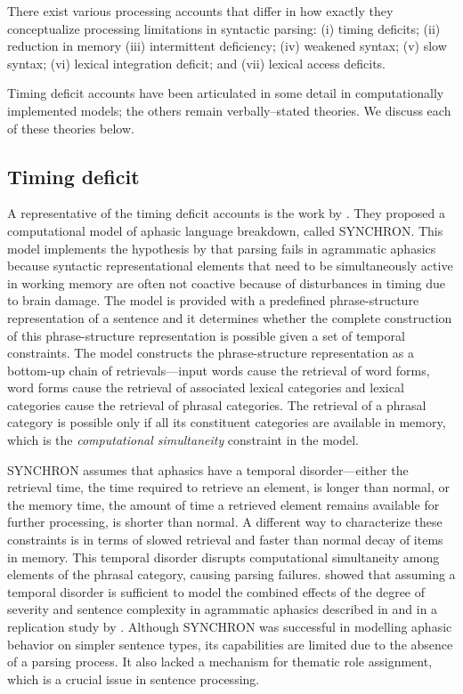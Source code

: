 \documentclass{cambridge7A}\usepackage[]{graphicx}\usepackage[]{color}
\begin{document}
There exist various processing accounts that differ in how exactly they conceptualize processing limitations in syntactic parsing:
(i) timing deficits;
(ii) reduction in memory
(iii) intermittent deficiency;
(iv) weakened syntax;
(v) slow syntax;
(vi) lexical integration deficit;
and (vii) lexical access deficits.

Timing deficit accounts have been articulated in some detail in computationally implemented models; the others remain verbally--stated theories. We discuss each of these theories below.

\subsection{Timing deficit}
A representative of the timing deficit accounts is the work by 
\cite{Haarmann-Kolk-1991}. They proposed a computational model of aphasic language breakdown, called SYNCHRON. This model implements the hypothesis by \cite{Kolk-vanGrunsven-1985} that parsing fails in agrammatic aphasics because syntactic representational elements that need to be simultaneously active in working memory are often not coactive because of disturbances in timing due to brain damage. The model is provided with a predefined phrase-structure representation of a sentence and it determines whether the complete construction of this phrase-structure representation is possible given a set of temporal constraints. The model constructs the phrase-structure representation as a bottom-up chain of retrievals---input words cause the retrieval of word forms, word forms cause the retrieval of associated lexical categories and lexical categories cause the retrieval of phrasal categories. The retrieval of a phrasal category is possible only if all its constituent categories are available in memory, which is the \emph{computational simultaneity} constraint in the model.

SYNCHRON assumes that aphasics have a temporal disorder---either the retrieval time, the time required to retrieve an element, is longer than normal, or the memory time, the amount of time a retrieved element remains available for further processing, is shorter than normal. 
A different way to characterize these constraints is in terms of slowed retrieval and faster than normal decay of items in memory.
This temporal disorder disrupts computational simultaneity among elements of the phrasal category, causing parsing failures. \cite{Haarmann-Kolk-1991} showed that assuming a temporal disorder is sufficient to model the combined effects of the degree of severity and sentence complexity in agrammatic aphasics described in \cite{Schwartz-EtAl-1980} and in a replication study by \cite{Kolk-vanGrunsven-1985}. Although SYNCHRON was successful in modelling aphasic behavior on simpler sentence types, its capabilities are limited due to the absence of a parsing process. It also lacked a mechanism for thematic role assignment, which is a crucial issue in sentence processing.
\end{document}

